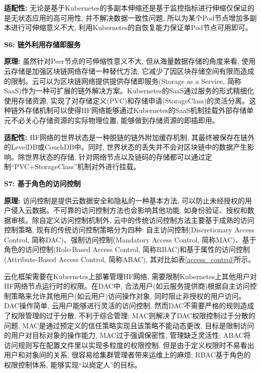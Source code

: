 \textbf{适配性: } 无论是基于Kubernetes的多副本伸缩还是基于监控指标进行伸缩仅保证的是无状态应用的高可用性, 并不解决数据一致性问题, 所以为某个Pod节点增加多副本进行可伸缩意义不大, 利用Kubernetes的自恢复能力保证单Pod节点可用即可。

\textbf{S6: 链外利用存储即服务}

\textbf{原理: } 虽然针对Peer节点的可伸缩性意义不大, 但从海量数据存储的角度来看, 使用云存储是加强区块链网络存储一种替代方法, 它减少了因区块存储空间有限而造成的限制\cite{gai2020blockchain}。云可以为区块链网络提供提供存储即服务(Storage as a Service, 简称SaaS)作为一种可扩展的链外解决方案。Kubernetes的SaaS通过服务的形式精细化使用存储资源, 实现了对存储定义(PVC)和存储申请(StorageClass)的灵活分离。这种链外存储机制可以使得HF网络能够通过Kubernetes的SaaS机制挂载外部存储单元不必关心存储资源的实际物理位置, 能够做到存储资源的即插即用。 

\textbf{适配性: }HF网络的世界状态是一种脱链的链外附加缓存机制, 其最终被保存在链外的LevelDB或CouchDB中。同时, 世界状态的丢失并不会对区块链中的数据产生影响。除世界状态的存储, 针对网络节点以及链码的存储都可以通过定制“PVC+StorageClass”机制对外进行挂载。


\textbf{S7: 基于角色的访问控制}

\textbf{原理: }访问控制是提供云数据安全和隐私的一种基本方法, 可以防止未经授权的用户侵入云数据。不可靠的访问控制方法也会影响其他功能, 如身份验证、授权和数据审核。除自定义访问控制机制外, 云中的传统访问控制方法主要基于成熟的访问控制策略, 现有的传统访问控制策略分为四种: 自主访问控制(Discretionary Access Control, 简称DAC)、强制访问控制(Mandatory Access Control, 简称MAC)、基于角色的访问控制(Role-Based Access Control, 简称RBAC)和基于属性的访问控制(Attribute-Based Access Control, 简称ABAC), 其对比如表\ref{access_control}所示。

云化框架需要在Kubernetes上部署管理HF网络, 需要限制Kubernetes上其他用户对HF网络节点运行时的权限。在DAC中, 合法用户(如云服务提供商)根据自主访问控制策略来允许其他用户(如云用户)访问操作对象\cite{lopez2018access}, 同时阻止非授权的用户访问。DAC操作简单, 云用户能够进行灵活的访问控制, 然而DAC不需要严格的规则造成了权限管理的过于分散, 不利于综合管理; MAC则解决了DAC权限控制过于分散的问题, MAC是通过预定义的信任策略实现且该策略不能动态更改, 目标是限制访问的用户对目标对象的操作能力, MAC过于强调保密性, 管理缺乏灵活性; ABAC将访问规则写在配置文件里以实现多粒度的权限控制, 但是由于定义权限时不易看出用户和对象间的关系, 很容易给集群管理者带来运维上的麻烦; RBAC基于角色的权限控制体系, 能够实现“以岗定人”的目标。

